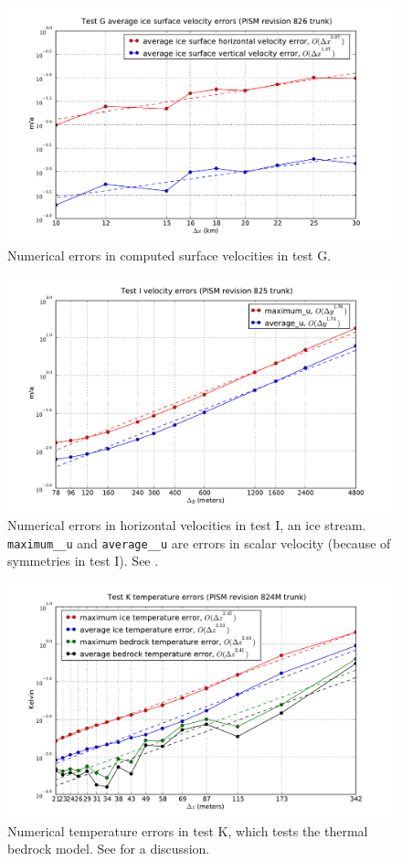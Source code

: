 \documentclass[11pt,final]{amsart}
\renewcommand{\t}[1]{\texttt{#1}}
\newcommand{\und}{\_\!\_}
\begin{document}
\begin{figure}[ht]
\includegraphics[width=5.0in,keepaspectratio=true]{test-G-surfvels}
\caption{Numerical errors in computed surface velocities in test G.}
\label{fig:surfvelerrsG}
\end{figure}

\begin{figure}[ht]
\includegraphics[width=5.0in,keepaspectratio=true]{test-I-errors}
\caption{Numerical errors in horizontal velocities in test I, an ice stream. \t{maximum\und u} and \t{average\und u} are errors in scalar velocity (because of symmetries in test I).  See \cite{SchoofStream,BBssasliding}.}
\label{fig:velerrsI}
\end{figure}

\begin{figure}[ht]
\includegraphics[width=5.0in,keepaspectratio=true]{test-K-errors}
\caption{Numerical temperature errors in test K, which tests the thermal bedrock model.  See \cite{BuelerTestK} for a discussion.}
\label{fig:temperrsK}
\end{figure}
\end{document}
